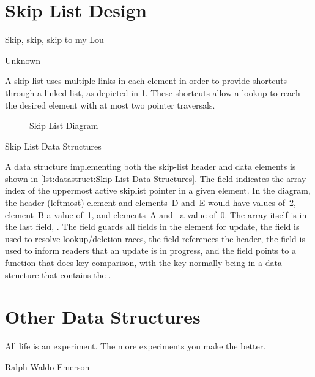 \section{Skip List Design}
\label{sec:skiplist:Skip List Design}
%
\epigraph{Skip, skip, skip to my Lou}
	 {Unknown}

A skip list uses multiple links in each element in order to
provide shortcuts through a linked list, as depicted in
\cref{fig:datastruct:Skip List Diagram}.
These shortcuts allow a lookup to reach the desired element with
at most two pointer traversals.

\begin{figure}
\centering
{}
\caption{Skip List Diagram}
\label{fig:datastruct:Skip List Diagram}
\end{figure}

\begin{listing}

\caption{Skip List Data Structures}
\label{lst:datastruct:Skip List Data Structures}
\end{listing}

A data structure implementing both the skip-list header and data
elements is shown in
\cref{lst:datastruct:Skip List Data Structures}.
The  field indicates the array index of the uppermost
active skiplist pointer in a given element.
In the diagram, the header (leftmost) element and elements~D and~E
would have  values of~2, element~B a value of~1,
and elements~A and~ a value of~0.
The array itself is in the last field, .
The  field guards all fields in the element for update,
the  field is used to resolve lookup/deletion races,
the  field references the header,
the  field is used to inform readers that an update is in
progress,
and the  field points to a function that does key
comparison, with the key normally being in a data structure that contains
the .

\section{Other Data Structures}
\label{sec:skiplist:Other Data Structures}
%
\epigraph{All life is an experiment.
	  The more experiments you make the better.}
	 {Ralph Waldo Emerson}

